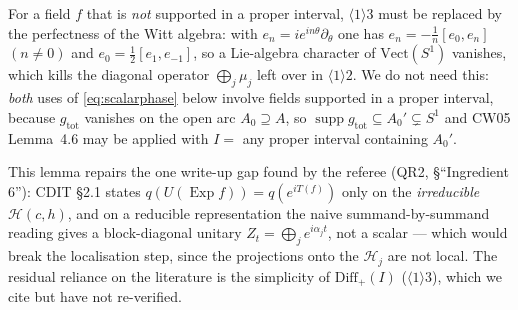 \documentclass[11pt]{article}
\newcommand{\Hil}{\mathcal H}
\newcommand{\Diff}{\mathrm{Diff}_+}
\newcommand{\Vect}{\mathrm{Vect}}
\newcommand{\gtot}{g_{\mathrm{tot}}}
\newcommand{\supp}{\operatorname{supp}}
\newcommand{\Exp}{\operatorname{Exp}}
\begin{document}
\begin{remark}\label{rem:phase-general}
For a field $f$ that is \emph{not} supported in a proper interval, $\langle1\rangle3$ must be replaced by the
perfectness of the Witt algebra: with $e_n=ie^{in\theta}\partial_\theta$ one has $e_n=-\frac1n[e_0,e_n]$ $(n\ne0)$
and $e_0=\frac12[e_1,e_{-1}]$, so a Lie-algebra character of $\Vect(S^1)$ vanishes, which kills the diagonal
operator $\bigoplus_j\mu_j$ left over in $\langle1\rangle2$.  We do not need this: \emph{both} uses of
\eqref{eq:scalarphase} below involve fields supported in a proper interval, because $\gtot$ vanishes on the open
arc $A_0\supseteq A$, so $\supp\gtot\subseteq A_0'\subsetneq S^1$ and CW05 Lemma~4.6 may be applied with
$I=$ any proper interval containing $A_0'$.
\end{remark}

\begin{verdictgap}
This lemma repairs the one write-up gap found by the referee (QR2, \S``Ingredient 6''): CDIT \S2.1 states
$q(U(\Exp f))=q(e^{iT(f)})$ only on the \emph{irreducible} $\Hil(c,h)$, and on a reducible representation the naive
summand-by-summand reading gives a block-diagonal unitary $Z_t=\bigoplus_je^{i\alpha_jt}$, not a scalar --- which
would break the localisation step, since the projections onto the $\Hil_j$ are not local.  The residual reliance on
the literature is the simplicity of $\Diff(I)$ ($\langle1\rangle3$), which we cite but have not re-verified.
\end{verdictgap}
\end{document}
